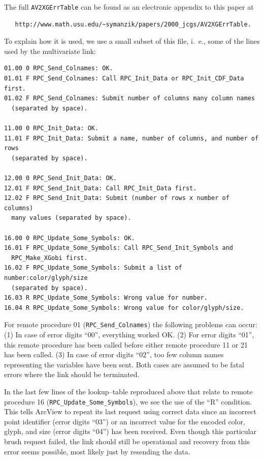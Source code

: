 The full {\tt AV2XGErrTable} can be found as an electronic appendix to
this paper at
\begin{verbatim}
   http://www.math.usu.edu/~symanzik/papers/2000_jcgs/AV2XGErrTable.
\end{verbatim}
To explain how it is used, we use a small subset
of this file, i.~e., some of the lines used by the multivariate link:

\footnotesize
\baselineskip10pt
\begin{verbatim}
01.00 0 RPC_Send_Colnames: OK.
01.01 F RPC_Send_Colnames: Call RPC_Init_Data or RPC_Init_CDF_Data first.
01.02 F RPC_Send_Colnames: Submit number of columns many column names 
  (separated by space).

11.00 0 RPC_Init_Data: OK.
11.01 F RPC_Init_Data: Submit a name, number of columns, and number of rows 
  (separated by space).

12.00 0 RPC_Send_Init_Data: OK.
12.01 F RPC_Send_Init_Data: Call RPC_Init_Data first.
12.02 F RPC_Send_Init_Data: Submit (number of rows x number of columns) 
  many values (separated by space).

16.00 0 RPC_Update_Some_Symbols: OK.
16.01 F RPC_Update_Some_Symbols: Call RPC_Send_Init_Symbols and 
  RPC_Make_XGobi first.
16.02 F RPC_Update_Some_Symbols: Submit a list of number:color/glyph/size 
  (separated by space).
16.03 R RPC_Update_Some_Symbols: Wrong value for number.
16.04 R RPC_Update_Some_Symbols: Wrong value for color/glyph/size.
\end{verbatim}
\normalsize

\noindent For remote procedure 01 (\verb#RPC_Send_Colnames#) the
following problems can occur: (1) In case of error digits ``00'',
everything worked OK. (2) For error digits ``01'', 
this remote procedure has been
called before either remote procedure 11 or 21 has been called. (3) In
case of error digits ``02'', too few column names representing the
variables have been sent.  Both cases are assumed to be fatal errors
where the link should be terminated. 

In the last few lines of the lookup--table reproduced above
that relate to remote procedure 16 
(\verb#RPC_Update_Some_Symbols#), we see the use of the ``R'' condition.
This tells ArcView to repeat its last request using correct data
since an incorrect point identifier (error digits ``03'') or an
incorrect value for the encoded color, glyph, and size (error digits
``04'') has been received. Even though this particular brush request
failed, the link should still be operational and recovery from this
error seems possible, most likely just by resending the data.


